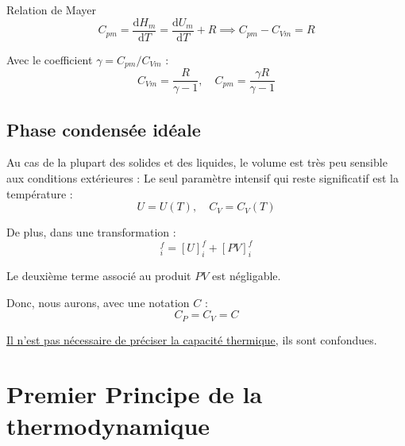 \begin{Theorem}{Relation de Mayer}{}
\begin{equation}
  C _{pm}= \frac{\mathrm{d} H_m}{\mathrm{d}T}  =  \frac{\mathrm{d}U_m}{\mathrm{d}T}  + R \implies C _{pm} - C _{Vm} = R
\end{equation}
\end{Theorem}

Avec le coefficient $\gamma =  C _{pm} / C _{Vm}$ : 
\begin{equation}
  C _{Vm} = \frac{R}{\gamma - 1} , \quad C _{pm} = \frac{\gamma R}{\gamma -1} 
\end{equation}







\subsection{Phase condensée idéale} %
\label{sub:Phase condensée idéale}

Au cas de la plupart des solides et des liquides, le volume est très peu sensible aux conditions extérieures : Le seul paramètre intensif qui reste significatif est la température : 
\begin{equation}
  U = U(T),\quad C_V = C_V(T)
\end{equation}

De plus, dans une transformation : 
\begin{equation}
[H] _{i} ^{f} = [U] _{i} ^{f} + [PV] _{i} ^{f}
\end{equation}

Le deuxième terme associé au produit $PV$ est négligable. 

Donc, nous aurons, avec une notation $C$ :  
\begin{equation}
  C_P = C_V = C
\end{equation}

\underline{Il n'est pas nécessaire de préciser la capacité thermique}, ils sont confondues.


\section{Premier Principe de la thermodynamique} %
\label{sec:Premier Principe de la thermodynamique}

